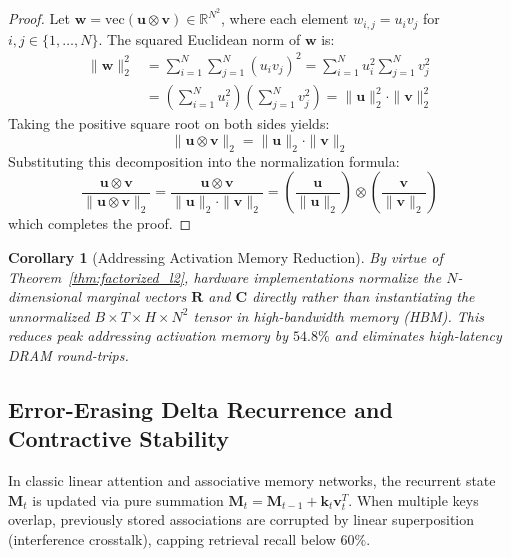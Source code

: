 \documentclass[11pt,a4paper]{article}
\newtheorem{corollary}{Corollary}[theorem]
\begin{document}
\begin{proof}
Let $\mathbf{w} = \text{vec}(\mathbf{u} \otimes \mathbf{v}) \in \mathbb{R}^{N^2}$, where each element $w_{i,j} = u_i v_j$ for $i, j \in \{1, \dots, N\}$. The squared Euclidean norm of $\mathbf{w}$ is:
\begin{align}
    \|\mathbf{w}\|_2^2 &= \sum_{i=1}^N \sum_{j=1}^N (u_i v_j)^2 = \sum_{i=1}^N u_i^2 \sum_{j=1}^N v_j^2 \\
    &= \left(\sum_{i=1}^N u_i^2\right) \left(\sum_{j=1}^N v_j^2\right) = \|\mathbf{u}\|_2^2 \cdot \|\mathbf{v}\|_2^2
\end{align}
Taking the positive square root on both sides yields:
\begin{equation}
    \|\mathbf{u} \otimes \mathbf{v}\|_2 = \|\mathbf{u}\|_2 \cdot \|\mathbf{v}\|_2
\end{equation}
Substituting this decomposition into the normalization formula:
\begin{equation}
    \frac{\mathbf{u} \otimes \mathbf{v}}{\|\mathbf{u} \otimes \mathbf{v}\|_2} = \frac{\mathbf{u} \otimes \mathbf{v}}{\|\mathbf{u}\|_2 \cdot \|\mathbf{v}\|_2} = \left(\frac{\mathbf{u}}{\|\mathbf{u}\|_2}\right) \otimes \left(\frac{\mathbf{v}}{\|\mathbf{v}\|_2}\right)
\end{equation}
which completes the proof.
\end{proof}

\begin{corollary}[Addressing Activation Memory Reduction]
By virtue of Theorem~\ref{thm:factorized_l2}, hardware implementations normalize the $N$-dimensional marginal vectors $\mathbf{R}$ and $\mathbf{C}$ directly rather than instantiating the unnormalized $B \times T \times H \times N^2$ tensor in high-bandwidth memory (HBM). This reduces peak addressing activation memory by $54.8\%$ and eliminates high-latency DRAM round-trips.
\end{corollary}

\subsection{Error-Erasing Delta Recurrence and Contractive Stability}
In classic linear attention and associative memory networks, the recurrent state $\mathbf{M}_t$ is updated via pure summation $\mathbf{M}_t = \mathbf{M}_{t-1} + \mathbf{k}_t \mathbf{v}_t^T$. When multiple keys overlap, previously stored associations are corrupted by linear superposition (interference crosstalk), capping retrieval recall below $60\%$.
\end{document}
